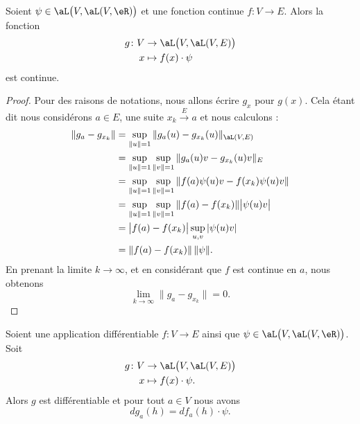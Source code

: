 \begin{lemma}
	Soient \( \psi\in\aL\big( V,\aL(V,\eR) \big)\) et une fonction continue \( f\colon V\to E\). Alors la fonction
	\begin{equation}
		\begin{aligned}
			g\colon V & \to \aL\big( V,\aL(V,E) \big) \\
			x         & \mapsto f(x)\cdot \psi
		\end{aligned}
	\end{equation}
	est continue.
\end{lemma}

\begin{proof}
	Pour des raisons de notations, nous allons écrire \( g_x\) pour \( g(x)\). Cela étant dit nous considérons \( a\in E\), une suite \( x_k\stackrel{E}{\longrightarrow}a \) et nous calculons :
	\begin{subequations}
		\begin{align}
			\| g_a-g_{x_k} \| & =\sup_{\| u \|=1}\| g_a(u)-g_{x_k}(u) \|_{\aL(V,E)}                    \\
			                  & =\sup_{\| u \|=1}\sup_{\| v \|=1}\| g_a(u)v-g_{x_k}(u)v \|_{E}         \\
			                  & =\sup_{\| u \|=1}\sup_{\| v \|=1}\| f(a)\psi(u)v-f(x_k)\psi(u)v \|     \\
			                  & =\sup_{\| u \|=1}\sup_{\| v \|=1}\| f(a)-f(x_k) \|\big| \psi(u)v \big| \\
			                  & =\big| f(a)-f(x_k) \big|\sup_{u,v}| \psi(u)v |                         \\
			                  & =\| f(a)-f(x_k) \|\,\| \psi \|.
		\end{align}
	\end{subequations}
	En prenant la limite \( k\to \infty\), et en considérant que \( f\) est continue en \( a\), nous obtenons
	\begin{equation}
		\lim_{k\to \infty} \| g_a-g_{x_k} \|=0.
	\end{equation}
\end{proof}

\begin{lemma}
	Soient une application différentiable \( f\colon V\to E\) ainsi que \( \psi\in\aL\big( V,\aL(V,\eR) \big)\). Soit
	\begin{equation}
		\begin{aligned}
			g\colon V & \to \aL\big(V, \aL(V,E) \big) \\
			x         & \mapsto f(x)\cdot \psi.
		\end{aligned}
	\end{equation}
	Alors \( g\) est différentiable et pour tout \( a\in V\) nous avons
	\begin{equation}
		dg_a(h)=df_a(h)\cdot \psi.
	\end{equation}
\end{lemma}


